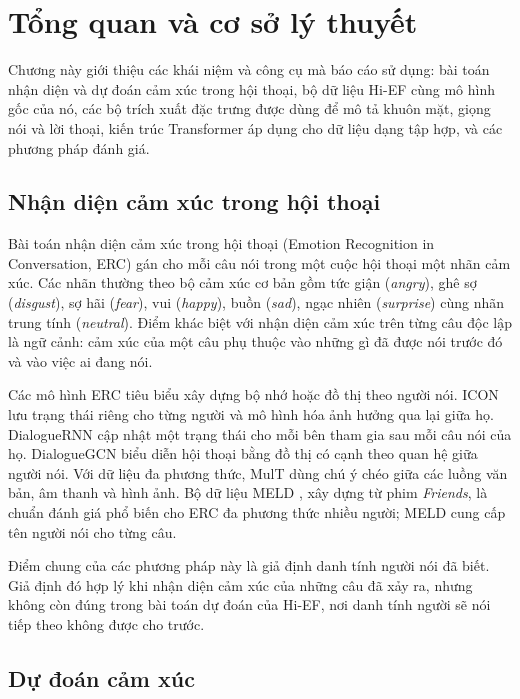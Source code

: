 \clearpage
{}
\setcounter{chapter}{0}
\chapter[TỔNG QUAN VÀ CƠ SỞ LÝ THUYẾT]{Tổng quan và cơ sở lý thuyết}

Chương này giới thiệu các khái niệm và công cụ mà báo cáo sử dụng: bài toán nhận diện và dự đoán cảm xúc trong hội thoại, bộ dữ liệu Hi-EF cùng mô hình gốc của nó, các bộ trích xuất đặc trưng được dùng để mô tả khuôn mặt, giọng nói và lời thoại, kiến trúc Transformer áp dụng cho dữ liệu dạng tập hợp, và các phương pháp đánh giá.

\section{Nhận diện cảm xúc trong hội thoại}

Bài toán nhận diện cảm xúc trong hội thoại (Emotion Recognition in Conversation, ERC) gán cho mỗi câu nói trong một cuộc hội thoại một nhãn cảm xúc. Các nhãn thường theo bộ cảm xúc cơ bản gồm tức giận (\emph{angry}), ghê sợ (\emph{disgust}), sợ hãi (\emph{fear}), vui (\emph{happy}), buồn (\emph{sad}), ngạc nhiên (\emph{surprise}) cùng nhãn trung tính (\emph{neutral}). Điểm khác biệt với nhận diện cảm xúc trên từng câu độc lập là ngữ cảnh: cảm xúc của một câu phụ thuộc vào những gì đã được nói trước đó và vào việc ai đang nói.

Các mô hình ERC tiêu biểu xây dựng bộ nhớ hoặc đồ thị theo người nói. ICON \cite{hazarika2018icon} lưu trạng thái riêng cho từng người và mô hình hóa ảnh hưởng qua lại giữa họ. DialogueRNN \cite{majumder2019dialoguernn} cập nhật một trạng thái cho mỗi bên tham gia sau mỗi câu nói của họ. DialogueGCN \cite{ghosal2019dialoguegcn} biểu diễn hội thoại bằng đồ thị có cạnh theo quan hệ giữa người nói. Với dữ liệu đa phương thức, MulT \cite{tsai2019mult} dùng chú ý chéo giữa các luồng văn bản, âm thanh và hình ảnh. Bộ dữ liệu MELD \cite{poria2019meld}, xây dựng từ phim \emph{Friends}, là chuẩn đánh giá phổ biến cho ERC đa phương thức nhiều người; MELD cung cấp tên người nói cho từng câu.

Điểm chung của các phương pháp này là giả định danh tính người nói đã biết. Giả định đó hợp lý khi nhận diện cảm xúc của những câu đã xảy ra, nhưng không còn đúng trong bài toán dự đoán của Hi-EF, nơi danh tính người sẽ nói tiếp theo không được cho trước.

\section{Dự đoán cảm xúc}

